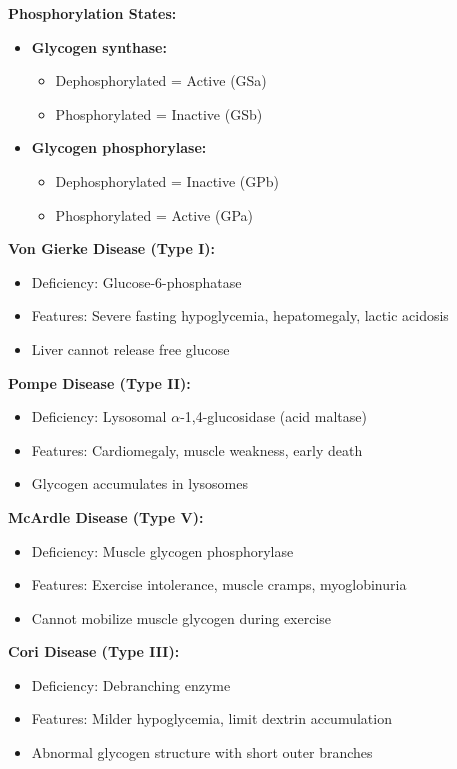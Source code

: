 \textbf{Phosphorylation States:}

\begin{itemize}
    \item \textbf{Glycogen synthase:}
    \begin{itemize}
        \item Dephosphorylated = Active (GSa)
        \item Phosphorylated = Inactive (GSb)
    \end{itemize}
    
    \item \textbf{Glycogen phosphorylase:}
    \begin{itemize}
        \item Dephosphorylated = Inactive (GPb)
        \item Phosphorylated = Active (GPa)
    \end{itemize}
\end{itemize}

\begin{tcolorbox}[colback=red!5, colframe=red!70!black, title=\textbf{Clinical Correlation: Glycogen Storage Diseases}]
\textbf{Von Gierke Disease (Type I):}
\begin{itemize}
    \item Deficiency: Glucose-6-phosphatase
    \item Features: Severe fasting hypoglycemia, hepatomegaly, lactic acidosis
    \item Liver cannot release free glucose
\end{itemize}

\textbf{Pompe Disease (Type II):}
\begin{itemize}
    \item Deficiency: Lysosomal $\alpha$-1,4-glucosidase (acid maltase)
    \item Features: Cardiomegaly, muscle weakness, early death
    \item Glycogen accumulates in lysosomes
\end{itemize}

\textbf{McArdle Disease (Type V):}
\begin{itemize}
    \item Deficiency: Muscle glycogen phosphorylase
    \item Features: Exercise intolerance, muscle cramps, myoglobinuria
    \item Cannot mobilize muscle glycogen during exercise
\end{itemize}

\textbf{Cori Disease (Type III):}
\begin{itemize}
    \item Deficiency: Debranching enzyme
    \item Features: Milder hypoglycemia, limit dextrin accumulation
    \item Abnormal glycogen structure with short outer branches
\end{itemize}
\end{tcolorbox}

